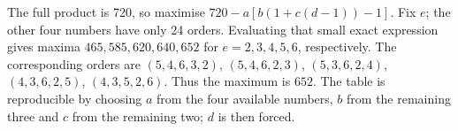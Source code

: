 The full product is 720, so maximise $720-a[b(1+c(d-1))-1]$. Fix $e$; the other four numbers have only 24 orders. Evaluating that small exact expression gives maxima $465,585,620,640,652$ for $e=2,3,4,5,6$, respectively. The corresponding orders are $(5,4,6,3,2)$, $(5,4,6,2,3)$, $(5,3,6,2,4)$, $(4,3,6,2,5)$, $(4,3,5,2,6)$. Thus the maximum is $\boxed{652}$. The table is reproducible by choosing $a$ from the four available numbers, $b$ from the remaining three and $c$ from the remaining two; $d$ is then forced.
